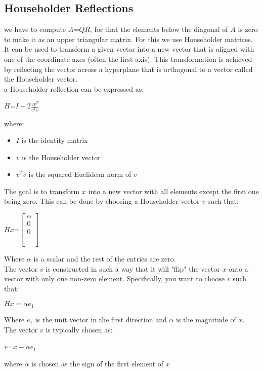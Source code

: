 \documentclass[journal]{IEEEtran}
\begin{document}
\subsection*{Householder Reflections}
we have to compute $A$=$QR$, for that the elements below the diagonal of $A$ is zero to make it as an upper triangular matrix. For this we use Householder matrices.\\
It can be used to transform a given vector into a new vector that is aligned with one of the coordinate axes (often the first axis). This transformation is achieved by reflecting the vector across a hyperplane that is orthogonal to a vector called the Householder vector.\\
a Householder reflection can be expressed as:
\begin{center}
    $H$=$I-2\frac{vv^T}{v^Tv}$
\end{center}
 where:\\
 \begin{itemize}
    \item $I$ is the identity matrix
    \item $v$ is the Householder vector
    \item $v^Tv$ is the squared Euclidean norm of $v$ 
\end{itemize}
The goal is to transform $x$ into a new vector with all elements except the first one being zero. This can be done by choosing a Householder vector $v$ such that:\\
\begin{center}
    $Hx$=$\begin{bmatrix}\alpha\\0\\0\\.\\.\\\end{bmatrix}$
\end{center}
Where $\alpha$ is a scalar and the rest of the entries are zero.\\
The vector $v$ is constructed in such a way that it will "flip" the vector $x$ onto a vector with only one non-zero element. Specifically, you want to choose $v$ such that:
\begin{center}
   $Hx=\alpha e_{1}$
\end{center}
Where $e_{1}$ is the unit vector in the first direction and $\alpha$ is the magnitude of $x$.\\
The vector $v$ is typically chosen as:
\begin{center}
  $v$=$x-\alpha e_{1}$
\end{center}
where $\alpha$ is chosen as the sign of the first element of $x$
\end{document}
